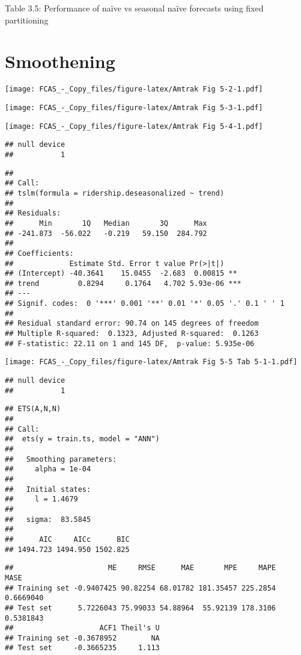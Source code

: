 \documentclass[]{article}
\begin{document}
Table 3.5: Performance of naïve vs seasonal naïve forecasts using fixed
partitioning

\section{Smoothening}\label{smoothening}

\texttt{[image: FCAS\_-\_Copy\_files/figure-latex/Amtrak Fig 5-2-1.pdf]}

\texttt{[image: FCAS\_-\_Copy\_files/figure-latex/Amtrak Fig 5-3-1.pdf]}

\texttt{[image: FCAS\_-\_Copy\_files/figure-latex/Amtrak Fig 5-4-1.pdf]}

\begin{verbatim}
## null device 
##           1
\end{verbatim}

\begin{verbatim}
## 
## Call:
## tslm(formula = ridership.deseasonalized ~ trend)
## 
## Residuals:
##      Min       1Q   Median       3Q      Max 
## -241.873  -56.022   -0.219   59.150  284.792 
## 
## Coefficients:
##             Estimate Std. Error t value Pr(>|t|)    
## (Intercept) -40.3641    15.0455  -2.683  0.00815 ** 
## trend         0.8294     0.1764   4.702 5.93e-06 ***
## ---
## Signif. codes:  0 '***' 0.001 '**' 0.01 '*' 0.05 '.' 0.1 ' ' 1
## 
## Residual standard error: 90.74 on 145 degrees of freedom
## Multiple R-squared:  0.1323, Adjusted R-squared:  0.1263 
## F-statistic: 22.11 on 1 and 145 DF,  p-value: 5.935e-06
\end{verbatim}

\texttt{[image: FCAS\_-\_Copy\_files/figure-latex/Amtrak Fig 5-5 Tab 5-1-1.pdf]}

\begin{verbatim}
## null device 
##           1
\end{verbatim}

\begin{verbatim}
## ETS(A,N,N) 
## 
## Call:
##  ets(y = train.ts, model = "ANN") 
## 
##   Smoothing parameters:
##     alpha = 1e-04 
## 
##   Initial states:
##     l = 1.4679 
## 
##   sigma:  83.5845
## 
##      AIC     AICc      BIC 
## 1494.723 1494.950 1502.825
\end{verbatim}

\begin{verbatim}
##                      ME     RMSE      MAE       MPE     MAPE      MASE
## Training set -0.9407425 90.82254 68.01782 181.35457 225.2854 0.6669040
## Test set      5.7226043 75.99033 54.88964  55.92139 178.3106 0.5381843
##                    ACF1 Theil's U
## Training set -0.3678952        NA
## Test set     -0.3665235     1.113
\end{verbatim}
\end{document}
